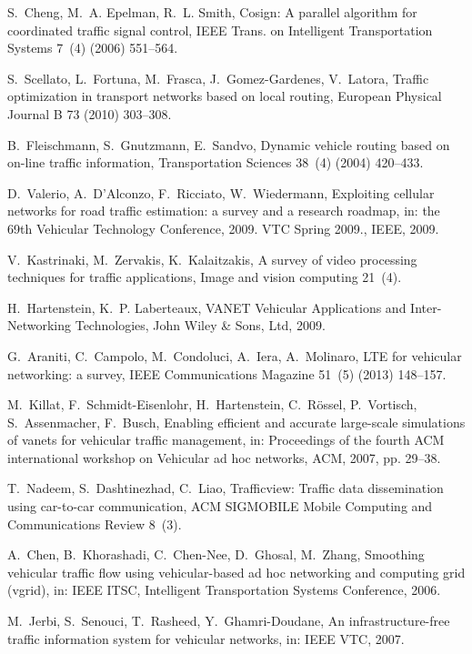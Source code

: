 \documentclass[10pt,onecolumn]{article}
\begin{document}
\begin{thebibliography}{00}
S.~Cheng, M.~A. Epelman, R.~L. Smith, Cosign: A parallel algorithm for
  coordinated traffic signal control, IEEE Trans. on Intelligent Transportation
  Systems 7~(4) (2006) 551--564.

S.~Scellato, L.~Fortuna, M.~Frasca, J.~Gomez-Gardenes, V.~Latora, Traffic
  optimization in transport networks based on local routing, European Physical
  Journal B 73 (2010) 303--308.

B.~Fleischmann, S.~Gnutzmann, E.~Sandvo, Dynamic vehicle routing based on
  on-line traffic information, Transportation Sciences 38~(4) (2004) 420--433.

D.~Valerio, A.~D'Alconzo, F.~Ricciato, W.~Wiedermann, Exploiting cellular
  networks for road traffic estimation: a survey and a research roadmap, in:
  the 69th Vehicular Technology Conference, 2009. VTC Spring 2009., IEEE, 2009.

V.~Kastrinaki, M.~Zervakis, K.~Kalaitzakis, A survey of video processing
  techniques for traffic applications, Image and vision computing 21~(4).

H.~Hartenstein, K.~P. Laberteaux, VANET Vehicular Applications and
  Inter-Networking Technologies, John Wiley \& Sons, Ltd, 2009.

G.~Araniti, C.~Campolo, M.~Condoluci, A.~Iera, A.~Molinaro, {LTE for vehicular
  networking: a survey}, IEEE Communications Magazine 51~(5) (2013) 148--157.

M.~Killat, F.~Schmidt-Eisenlohr, H.~Hartenstein, C.~R{\"o}ssel, P.~Vortisch,
  S.~Assenmacher, F.~Busch, Enabling efficient and accurate large-scale
  simulations of vanets for vehicular traffic management, in: Proceedings of
  the fourth ACM international workshop on Vehicular ad hoc networks, ACM,
  2007, pp. 29--38.

T.~Nadeem, S.~Dashtinezhad, C.~Liao, Trafficview: Traffic data dissemination
  using car-to-car communication, ACM SIGMOBILE Mobile Computing and
  Communications Review 8~(3).

A.~Chen, B.~Khorashadi, C.~Chen-Nee, D.~Ghosal, M.~Zhang, Smoothing vehicular
  traffic flow using vehicular-based ad hoc networking and computing grid
  (vgrid), in: IEEE ITSC, Intelligent Transportation Systems Conference, 2006.

M.~Jerbi, S.~Senouci, T.~Rasheed, Y.~Ghamri-Doudane, An infrastructure-free
  traffic information system for vehicular networks, in: IEEE VTC, 2007.


\end{thebibliography}
\end{document}
